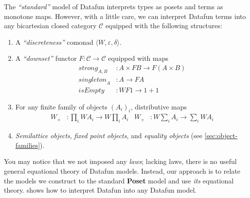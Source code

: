 \documentclass{rntz}\usepackage[a5]{rntzgeometry}\usepackage[fullwidth=130mm,width=330pt,]{narrow}
\newcommand\isocolor{\color{ForestGreen}} %
\newcommand\cat\textbf
\newcommand\Poset{\cat{Poset}}
\newcommand\termO{1}
\newcommand\x\times
\newcommand\tuple[1]{\langle{#1}\rangle}
\newcommand\<{\mskip 4mu plus 4mu minus 1mu}
\newcommand\catC{\ensuremath{\mathcal{C}}}
\newcommand\down{\ensuremath{F}}
\newcommand\disco{\ensuremath{W}}
\newcommand\downof[1]{\down #1}
\newcommand\discof[1]{\ensuremath{\disco #1}}
\newcommand\morph\mathit
\begin{document}
The \emph{``standard''} model of Datafun interprets types as posets and terms as
monotone maps. However, with a little care, we can interpret Datafun terms into
any bicartesian closed category \catC{} equipped with the following structures:

\begin{enumerate}
\item A \emph{``discreteness''} comonad $\tuple{\disco{}, \varepsilon, \delta}$.

\item A \emph{``downset''} functor \(\down : \catC \to \catC\) equipped with
  maps
  \begin{align*}
    \morph{strong}_{A,B} &: A \x \downof{B} \to \downof{(A \x B)}\\
    \morph{singleton}_A &: A \to \downof{A}\\
    \morph{isEmpty} &: \discof{\downof{\termO}} \to \termO + \termO
  \end{align*}

\item For any finite family of objects $(A_i)_i$, distributive maps
  \begin{align*}
    \disco_\x &: \prod_i \discof{A_i} \to \disco \prod_i A_i
    &
    \disco_+ &: \disco \sum_i A_i \to \sum_i \discof{A_i}
  \end{align*}

\item \emph{Semilattice objects}, \emph{fixed point objects}, and \emph{equality
  objects} (see \cref{sec:object-families}).

\end{enumerate}

You may notice that we not imposed any \emph{laws}; lacking laws, there is no
useful general equational theory of Datafun models. Instead, our approach is to
relate the models we construct to the standard \Poset{} model and use \emph{its}
equational theory.  shows how to interpret Datafun
into any Datafun model.


\newcommand\cxs[2]{{\isocolor #1}\mathop{;}#2}
\newcommand\emptycx{}

\newcommand\eqt[1]{\underaccent{\mathrm{eq}}{#1}}
\newcommand\eeq[2]{#1 = #2}
\end{document}
